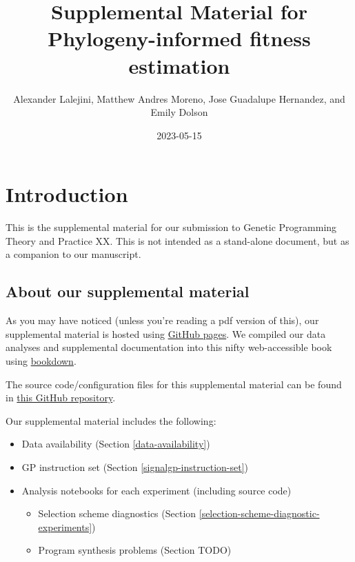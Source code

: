 \documentclass[
]{book}
\title{Supplemental Material for Phylogeny-informed fitness estimation}
\author{Alexander Lalejini, Matthew Andres Moreno, Jose Guadalupe Hernandez, and Emily Dolson}
\date{2023-05-15}
\providecommand{\tightlist}{%
  \setlength{\itemsep}{0pt}\setlength{\parskip}{0pt}}
\begin{document}
\maketitle

{
\setcounter{tocdepth}{1}
\tableofcontents
}
\hypertarget{introduction}{%
\chapter{Introduction}\label{introduction}}

This is the supplemental material for our submission to Genetic Programming Theory and Practice XX.
This is not intended as a stand-alone document, but as a companion to our manuscript.

\hypertarget{about-our-supplemental-material}{%
\section{About our supplemental material}\label{about-our-supplemental-material}}

As you may have noticed (unless you're reading a pdf version of this), our supplemental material is hosted using \href{https://pages.github.com/}{GitHub pages}.
We compiled our data analyses and supplemental documentation into this nifty web-accessible book using \href{https://bookdown.org}{bookdown}.

The source code/configuration files for this supplemental material can be found in \href{https://github.com/amlalejini/phylogeny-informed-evaluation}{this GitHub repository}.

Our supplemental material includes the following:

\begin{itemize}
\tightlist
\item
  Data availability (Section \ref{data-availability})
\item
  GP instruction set (Section \ref{signalgp-instruction-set})
\item
  Analysis notebooks for each experiment (including source code)

  \begin{itemize}
  \tightlist
  \item
    Selection scheme diagnostics (Section \ref{selection-scheme-diagnostic-experiments})
  \item
    Program synthesis problems (Section TODO)
  \end{itemize}
\end{itemize}
\end{document}
